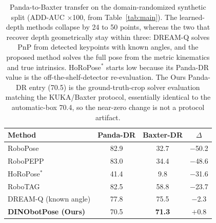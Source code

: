 \begin{table}[t!]
\centering
\renewcommand{\arraystretch}{1.1}
\setlength{\tabcolsep}{6pt}
\begin{tabular}{@{} l ccc @{}}
\toprule
\textbf{Method} & \textbf{Panda-DR} & \textbf{Baxter-DR} & $\Delta$ \\
\midrule
RoboPose & 82.9 & 32.7 & $-$50.2 \\
RoboPEPP & 83.0 & 34.4 & $-$48.6 \\
HoRoPose$^{*}$ & 41.4 & 9.8 & $-$31.6 \\
RoboTAG & 82.5 & 58.8 & $-$23.7 \\
\midrule
DREAM-Q (known angle) & 77.8 & 75.5 & $-$2.3 \\
\textbf{DINObotPose (Ours)} & 70.5 & \textbf{71.3} & $\mathbf{+0.8}$ \\
\bottomrule
\end{tabular}
\caption{Panda-to-Baxter transfer on the domain-randomized synthetic split (ADD-AUC $\times$100, from Table~\ref{tab:main}). The learned-depth methods collapse by 24 to 50 points, whereas the two that recover depth geometrically stay within three: DREAM-Q solves PnP from detected keypoints with known angles, and the proposed method solves the full pose from the metric kinematics and true intrinsics. HoRoPose$^{*}$ starts low because its Panda-DR value is the off-the-shelf-detector re-evaluation. The Ours Panda-DR entry (70.5) is the ground-truth-crop solver evaluation matching the KUKA/Baxter protocol, essentially identical to the automatic-box 70.4, so the near-zero change is not a protocol artifact.}
\label{tab:baxtercollapse}
\end{table}

